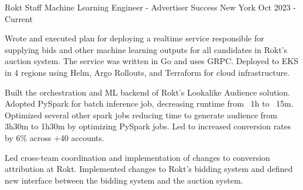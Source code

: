 

\begin{cventries}
\cventrywide
  {Rokt} %
  {Staff Machine Learning Engineer - Advertiser Success} %
  {New York} %
  {Oct 2023 - Current} %
  {
    \begin{cvitems} %
      \item {Wrote and executed plan for deploying a realtime service responsible for supplying bids and other machine learning outputs for all candidates in Rokt's auction system. The service was written in Go and uses GRPC. Deployed to EKS in 4 regions using Helm, Argo Rollouts, and Terraform for cloud infrastructure.}
      \item {Built the orchestration and ML backend of Rokt's Lookalike Audience solution. Adopted PySpark for batch inference job, decreasing runtime from ~1h to ~15m. Optimized several other spark jobs reducing time to generate audience from 3h30m to 1h30m by optimizing PySpark jobs. Led to increased conversion rates by 6\% across +40 accounts.}
      \item {Led cross-team coordination and implementation of changes to conversion attribution at Rokt. Implemented changes to Rokt's bidding system and defined new interface between the bidding system and the auction system.}
    \end{cvitems}
  }


\end{cventries}
